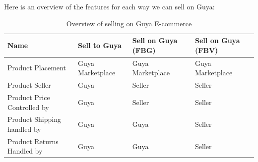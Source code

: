 Here is an overview of the features for each way we can sell on Guya:

\begin{table}%
\begin{tabular}{|p{3cm}|p{3cm}|p{3cm}|p{3cm}|}
\hline
Name & Sell to Guya & Sell on Guya (FBG) & Sell on Guya (FBV) \\
\hline
Product Placement & Guya Marketplace & Guya Marketplace & Guya Marketplace \\
\hline
Product Seller & Guya & Seller & Seller \\ 
\hline 
Product Price Controlled by & Guya & Seller & Seller \\
\hline
Product Shipping handled by & Guya & Guya & Seller \\
\hline
Product Returns Handled by & Guya & Guya & Seller \\
\hline
\end{tabular}

\caption{Overview of selling on Guya E-commerce}
\label{selling_on_guya_table}

\end{table}

